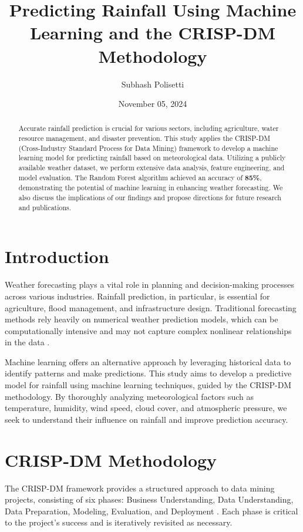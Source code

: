 \documentclass[12pt]{article}
\title{Predicting Rainfall Using Machine Learning and the CRISP-DM Methodology}
\author{Subhash Polisetti}
\date{November 05, 2024}
\begin{document}
\maketitle

\begin{abstract}
Accurate rainfall prediction is crucial for various sectors, including agriculture, water resource management, and disaster prevention. This study applies the CRISP-DM (Cross-Industry Standard Process for Data Mining) framework to develop a machine learning model for predicting rainfall based on meteorological data. Utilizing a publicly available weather dataset, we perform extensive data analysis, feature engineering, and model evaluation. The Random Forest algorithm achieved an accuracy of \textbf{85\%}, demonstrating the potential of machine learning in enhancing weather forecasting. We also discuss the implications of our findings and propose directions for future research and publications.

\end{abstract}

\section{Introduction}
Weather forecasting plays a vital role in planning and decision-making processes across various industries. Rainfall prediction, in particular, is essential for agriculture, flood management, and infrastructure design. Traditional forecasting methods rely heavily on numerical weather prediction models, which can be computationally intensive and may not capture complex nonlinear relationships in the data \cite{numerical_weather}.

Machine learning offers an alternative approach by leveraging historical data to identify patterns and make predictions. This study aims to develop a predictive model for rainfall using machine learning techniques, guided by the CRISP-DM methodology. By thoroughly analyzing meteorological factors such as temperature, humidity, wind speed, cloud cover, and atmospheric pressure, we seek to understand their influence on rainfall and improve prediction accuracy.

\section{CRISP-DM Methodology}
The CRISP-DM framework provides a structured approach to data mining projects, consisting of six phases: Business Understanding, Data Understanding, Data Preparation, Modeling, Evaluation, and Deployment \cite{crispdm}. Each phase is critical to the project's success and is iteratively revisited as necessary.
\end{document}
